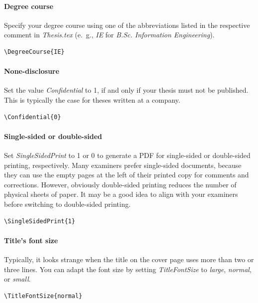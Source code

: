 
\paragraph{Degree course} Specify your degree course using one of the abbreviations listed in the respective comment in \emph{Thesis.tex} (e.~g., \emph{IE} for \emph{B.Sc. Information Engineering}).
%
\begin{lstlisting}[language=bash]
\DegreeCourse{IE}
\end{lstlisting}


\paragraph{None-disclosure} Set the value \emph{Confidential} to 1, if and only if your thesis must not be published. This is typically the case for theses written at a company.
%
\begin{lstlisting}[language=bash]
\Confidential{0}
\end{lstlisting}


\paragraph{Single-sided or double-sided} Set \emph{SingleSidedPrint} to 1 or 0 to generate a PDF for single-sided or double-sided printing, respectively. Many examiners prefer single-sided documents, because they can use the empty pages at the left of their printed copy for comments and corrections. However, obviously double-sided printing reduces the number of physical sheets of paper. It may be a good idea to align with your examiners before switching to double-sided printing.
%
\begin{lstlisting}[language=bash]
\SingleSidedPrint{1}
\end{lstlisting}


\paragraph{Title's font size} Typically, it looks strange when the title on the cover page uses more than two or three lines. You can adapt the font size by setting \emph{TitleFontSize} to \emph{large}, \emph{normal}, or \emph{small}.
%
\begin{lstlisting}[language=bash]
\TitleFontSize{normal}
\end{lstlisting}

